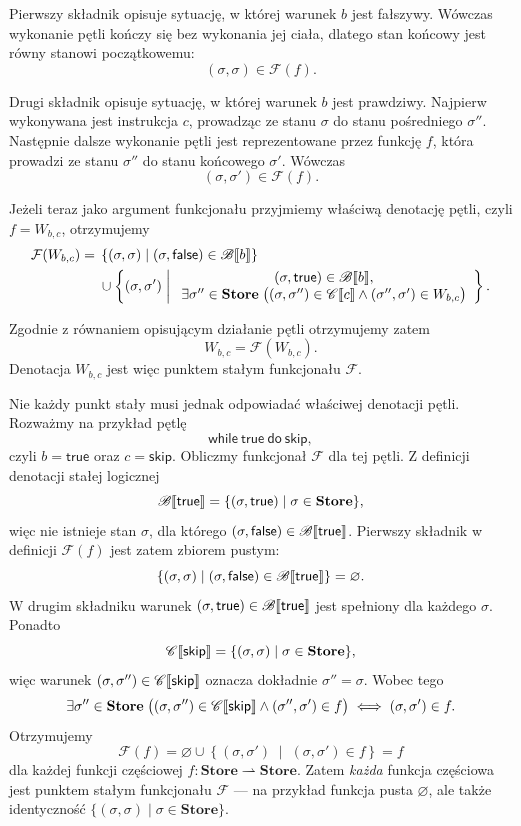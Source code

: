 \documentclass[11pt,a4paper]{article}
\theoremstyle{definition}
\theoremstyle{plain}
\DeclarePairedDelimiter{\semdelim}{\llbracket}{\rrbracket}
\newcommand{\sem}[1]{\semdelim{#1}}
\newcommand{\Cc}{\mathscr{C}}   %
\newcommand{\Bb}{\mathscr{B}}   %
\newcommand{\Store}{\textbf{Store}}
\newcommand{\kw}[1]{\ensuremath{\mathsf{#1}}} %
\begin{document}
Pierwszy składnik opisuje sytuację, w której warunek $b$ jest fałszywy.
Wówczas wykonanie pętli kończy się bez wykonania jej ciała, dlatego stan
końcowy jest równy stanowi początkowemu:
\[
(\sigma,\sigma)\in\mathcal{F}(f).
\]

Drugi składnik opisuje sytuację, w której warunek $b$ jest prawdziwy.
Najpierw wykonywana jest instrukcja $c$, prowadząc ze stanu $\sigma$
do stanu pośredniego $\sigma''$. Następnie dalsze wykonanie pętli jest
reprezentowane przez funkcję $f$, która prowadzi ze stanu $\sigma''$ do
stanu końcowego $\sigma'$. Wówczas
\[
(\sigma,\sigma')\in\mathcal{F}(f).
\]

Jeżeli teraz jako argument funkcjonału przyjmiemy właściwą denotację
pętli, czyli $f=W_{b,c}$, otrzymujemy
\[
\begin{aligned}
	\mathcal{F}(W_{b,c})
	={}&
	\left\{
	(\sigma,\sigma)
	\;\middle|\;
	(\sigma,\kw{false})\in\Bb\sem{b}
	\right\}\\
	&{}\cup
	\left\{
	(\sigma,\sigma')
	\;\middle|\;
	\begin{array}{c}
		(\sigma,\kw{true})\in\Bb\sem{b},\\
		\exists\sigma''\in\Store\;
		\big(
		(\sigma,\sigma'')\in\Cc\sem{c}
		\land
		(\sigma'',\sigma')\in W_{b,c}
		\big)
	\end{array}
	\right\}.
\end{aligned}
\]

Zgodnie z równaniem opisującym działanie pętli otrzymujemy zatem
\[
W_{b,c}=\mathcal{F}(W_{b,c}).
\]
Denotacja $W_{b,c}$ jest więc punktem stałym funkcjonału $\mathcal F$.

Nie każdy punkt stały musi jednak odpowiadać właściwej denotacji pętli.
Rozważmy na przykład pętlę
\[
\kw{while}\ \kw{true}\ \kw{do}\ \kw{skip},
\]
czyli $b=\kw{true}$ oraz $c=\kw{skip}$. Obliczmy funkcjonał
$\mathcal F$ dla tej pętli. Z definicji denotacji stałej logicznej
\[
\Bb\sem{\kw{true}}=\{(\sigma,\kw{true})\mid\sigma\in\Store\},
\]
więc nie istnieje stan $\sigma$, dla którego
$(\sigma,\kw{false})\in\Bb\sem{\kw{true}}$. Pierwszy składnik w
definicji $\mathcal F(f)$ jest zatem zbiorem pustym:
\[
\left\{
(\sigma,\sigma)
\;\middle|\;
(\sigma,\kw{false})\in\Bb\sem{\kw{true}}
\right\}
=\varnothing.
\]
W drugim składniku warunek $(\sigma,\kw{true})\in\Bb\sem{\kw{true}}$
jest spełniony dla każdego $\sigma$. Ponadto
\[
\Cc\sem{\kw{skip}}=\{(\sigma,\sigma)\mid\sigma\in\Store\},
\]
więc warunek $(\sigma,\sigma'')\in\Cc\sem{\kw{skip}}$ oznacza dokładnie
$\sigma''=\sigma$. Wobec tego
\[
\exists\sigma''\in\Store\;
\big(
(\sigma,\sigma'')\in\Cc\sem{\kw{skip}}
\land
(\sigma'',\sigma')\in f
\big)
\iff
(\sigma,\sigma')\in f.
\]
Otrzymujemy
\[
\mathcal F(f)
=
\varnothing
\cup
\left\{(\sigma,\sigma')\;\middle|\;(\sigma,\sigma')\in f\right\}
=
f
\]
dla każdej funkcji częściowej $f:\Store\rightharpoonup\Store$. Zatem
\emph{każda} funkcja częściowa jest punktem stałym funkcjonału
$\mathcal F$ --- na przykład funkcja pusta $\varnothing$, ale także
identyczność $\{(\sigma,\sigma)\mid\sigma\in\Store\}$.
\end{document}
